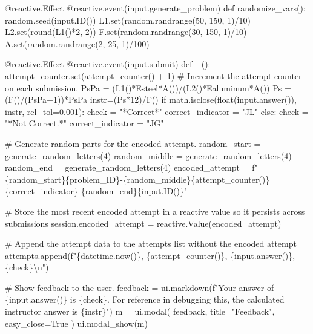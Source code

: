 \documentclass[
  letterpaper,
  DIV=11,
  numbers=noendperiod]{scrreprt}
\newenvironment{Shaded}{\begin{snugshade}}{\end{snugshade}}
\newcommand{\NormalTok}[1]{\textcolor[rgb]{0.00,0.23,0.31}{#1}}
\begin{document}
\begin{Shaded}
\begin{Highlighting}[]
\NormalTok{    @reactive.Effect}
\NormalTok{    @reactive.event(input.generate\_problem)}
\NormalTok{    def randomize\_vars():}
\NormalTok{        random.seed(input.ID())}
\NormalTok{        L1.set(random.randrange(50, 150, 1)/10)}
\NormalTok{        L2.set(round(L1()*2, 2))}
\NormalTok{        F.set(random.randrange(30, 150, 1)/10)}
\NormalTok{        A.set(random.randrange(2, 25, 1)/100)}
        
\NormalTok{    @reactive.Effect}
\NormalTok{    @reactive.event(input.submit)}
\NormalTok{    def \_():}
\NormalTok{        attempt\_counter.set(attempt\_counter() + 1)  \# Increment the attempt counter on each submission.}
\NormalTok{        PsPa = (L1()*Esteel*A())/(L2()*Ealuminum*A())}
\NormalTok{        Ps = (F()/(PsPa+1))*PsPa}
\NormalTok{        instr=(Ps*12)/F()}
\NormalTok{        if math.isclose(float(input.answer()), instr, rel\_tol=0.001):}
\NormalTok{            check = "*Correct*"}
\NormalTok{            correct\_indicator = "JL"}
\NormalTok{        else:}
\NormalTok{            check = "*Not Correct.*"}
\NormalTok{            correct\_indicator = "JG"}

\NormalTok{        \# Generate random parts for the encoded attempt.}
\NormalTok{        random\_start = generate\_random\_letters(4)}
\NormalTok{        random\_middle = generate\_random\_letters(4)}
\NormalTok{        random\_end = generate\_random\_letters(4)}
\NormalTok{        encoded\_attempt = f"\{random\_start\}\{problem\_ID\}{-}\{random\_middle\}\{attempt\_counter()\}\{correct\_indicator\}{-}\{random\_end\}\{input.ID()\}"}

\NormalTok{        \# Store the most recent encoded attempt in a reactive value so it persists across submissions}
\NormalTok{        session.encoded\_attempt = reactive.Value(encoded\_attempt)}

\NormalTok{        \# Append the attempt data to the attempts list without the encoded attempt}
\NormalTok{        attempts.append(f"\{datetime.now()\}, \{attempt\_counter()\}, \{input.answer()\}, \{check\}\textbackslash{}n")}

\NormalTok{        \# Show feedback to the user.}
\NormalTok{        feedback = ui.markdown(f"Your answer of \{input.answer()\} is \{check\}. For reference in debugging this, the calculated instructor answer is \{instr\}")}
\NormalTok{        m = ui.modal(}
\NormalTok{            feedback,}
\NormalTok{            title="Feedback",}
\NormalTok{            easy\_close=True}
\NormalTok{        )}
\NormalTok{        ui.modal\_show(m)}


\end{Highlighting}
\end{Shaded}
\end{document}
